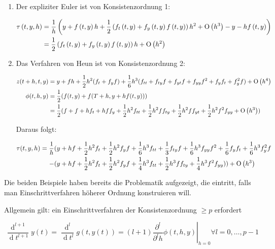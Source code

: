 \begin{example}
	\*
	\begin{enumerate}
		\item
			Der expliziter Euler ist von Konsistenzordnung 1:
			
			\begin{align*}
				\tau\left(t,y,h\right) &= \frac{1}{h} \left(y + f\left(t,y\right) h + \frac{1}{2} \left(f_t\left(t,y\right) + f_y\left(t,y\right) f\left(t,y\right)\right) h^2 + \operatorname{O}\left(h^3\right) - y - hf\left(t,y\right)\right) \\
				& = \frac{1}{2} \left(f_t\left(t,y\right) + f_y\left(t,y\right) f\left(t,y\right)\right) h + \operatorname{O}\left(h^2\right) 
			\end{align*}
			
		\item
			Das Verfahren von Heun ist von Konsistenzordnung 2:
			
			\begin{align*}
				z(t+h,t,y) &= y+f h + \frac{1}{2} h^2 (f_t + f_yf) + \frac{1}{6} h^3(f_{tt} + f_{ty}f + f_{yt} f + f_{yy}f^2 + f_yf_t + f_y^2 f) + \operatorname{O}\left(h^4\right) \\
				\phi(t,h,y) &= \frac{1}{2} ( f(t,y) + f(T+h, y+hf(t,y))) \\
				&= \frac{1}{2} (f + f + hf_t + h f f_y + \frac{1}{2} h^2 f_{tt} + \frac{1}{2}  h^{2} f f_{ty}+ \frac{1}{2}  h^{2} f f_{yt} + \frac{1}{2} h^2 f^2 f_{yy} + \operatorname{O}\left(h^3\right))
			\end{align*}
			
			Daraus folgt:
			
			\begin{align*}
				\tau(t,y,h) = \frac{1}{h} &(y + hf + \frac{1}{2} h^2 f_t + \frac{1}{2} h^2 f_yf + \frac{1}{6} h^3 f_{tt} + \frac{1}{3} f_{ty}f + \frac{1}{6} h^3 f_{yy} f^2 + \frac{1}{6} f_yf_t + \frac{1}{6} h^3 f_y^2 f \\
				- &(y + hf + \frac{1}{2} h^2 f_t + \frac{1}{2} h^2 f_yf +\frac{1}{4}h^3 f_{tt}+ \frac{1}{2} h^3 ff_{ty} + \frac{1}{4} h^3 f^2f_{yy})) + \operatorname{O}\left(h^3\right)
			\end{align*}
	\end{enumerate}
\end{example}

Die beiden Beispiele haben bereits die Problematik aufgezeigt, die eintritt, falls man Einschrittverfahren höherer Ordnung konstruieren will. 

Allgemein gilt: ein Einschrittverfahren der Konsistenzordnung $\ge p$ erfordert 

$$\frac{\operatorname{d}^{l+1}}{\operatorname{d}t^{l+1}} y(t) = \frac{\operatorname{d}^{l}}{\operatorname{d}t^{l}} g(t,y(t)) = \left. (l+1) \frac{\partial^l}{\partial^l h} \phi (t,h,y) \right|_{h = 0} \forall l=0, \dots, p-1$$ 

